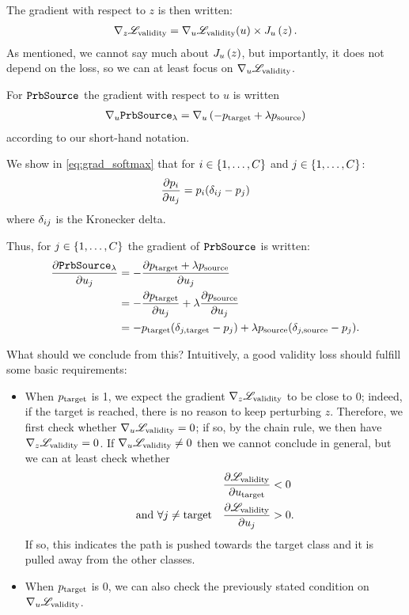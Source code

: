 \documentclass[../main.tex]{subfiles}
\begin{document}
The gradient with respect to $z$ is then written:
\begin{align*}
 \grad{\lossval}{z} = \grad{\lossval(u)}{u} \times \jac{u}{z}.
\end{align*}
As mentioned, we cannot say much about $\jac{u}{z}$, but importantly, it does not depend on the loss,
so we can at least focus on $\grad{\lossval}{u}$.

For $\PrbSource{}$ the gradient with respect to $u$ is written
\begin{align*}
    \grad{\PrbSource{\lambda}}{u}
    = \grad{ \left( - p_\target + \lambda p_\source \right) }{u}
\end{align*}
according to our short-hand notation.


We show in \autoref{eq:grad_softmax} that for $i \in \discreteinterval{1}{\outputdim}$ and 
$j \in \discreteinterval{1}{\outputdim}$:
\begin{align*}
    \del{p_i}{u_j} = p_i ( \dij  -  p_j )
\end{align*}
where $\dij$ is the Kronecker delta.

Thus, for $j \in \discreteinterval{1}{\outputdim}$ the gradient of $\PrbSource{}$ is written:
\begin{align*}
    \del{\PrbSource{\lambda}}{u_j}
=  - & \del{p_\target  + \lambda p_\source}{u_j}  \\
=  - & \del{p_\target }{u_j} + \lambda \del{p_\source}{u_j}  \\
=  - & p_\target (\djt - p_j) + \lambda p_\source (\djs - p_j).
\end{align*}

What should we conclude from this?
Intuitively, a good validity loss should fulfill some basic requirements:
\begin{itemize}
    \item When $p_\target$ is 1, we expect the gradient $\grad{\lossval}{z}$ to be close to 0; indeed, if the target is reached, there is no reason to keep perturbing $z$.
    Therefore, we first check whether $\grad{\lossval}{u} = 0$; if so, by the chain rule, we then have $\grad{\lossval}{z} = 0$.
    If $\grad{\lossval}{u} \neq 0$ then we cannot conclude in general, but we can at least check whether 
    \begin{align*}
                                 \del{\lossval}{u_\target} &< 0 \\ 
    \text{and } \forall j \neq \target \quad \del{\lossval}{u_j} &> 0.
    \end{align*}
    If so, this indicates the path is pushed towards the target class
    and it is pulled away from the other classes.

    \item When $p_\target$ is 0, we can also check the previously stated condition on $\grad{\lossval}{u}$.
\end{itemize}
\end{document}

